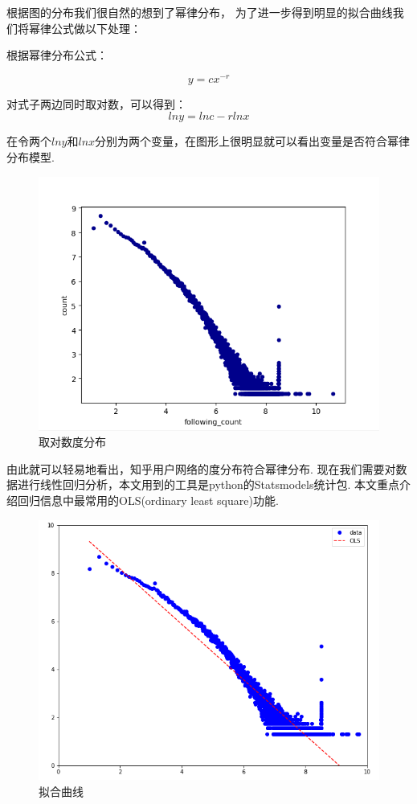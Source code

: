 \documentclass[bachelor,adobefonts]{jnuthesis}
\begin{document}
根据图的分布我们很自然的想到了幂律分布，
为了进一步得到明显的拟合曲线我们将幂律公式做以下处理：

根据幂律分布公式：

\begin{equation}
  y = cx^{-r}
\end{equation}

对式子两边同时取对数，可以得到：
\begin{equation}
  lny = lnc -rlnx
\end{equation}

在令两个$lny$和$lnx$分别为两个变量，在图形上很明显就可以看出变量是否符合幂律分布模型.

\begin{figure}[h!]
  \centering
  \includegraphics[width=0.8\linewidth]{Wlog.png}
  \caption{取对数度分布}
\end{figure}

由此就可以轻易地看出，知乎用户网络的度分布符合幂律分布.
现在我们需要对数据进行线性回归分析，本文用到的工具是python的Statsmodels统计包.
本文重点介绍回归信息中最常用的OLS(ordinary least square)功能.

\begin{figure}[h!]
  \centering
  \includegraphics[width=0.8\linewidth]{Wnihe.png}
  \caption{拟合曲线}
\end{figure}
\end{document}
